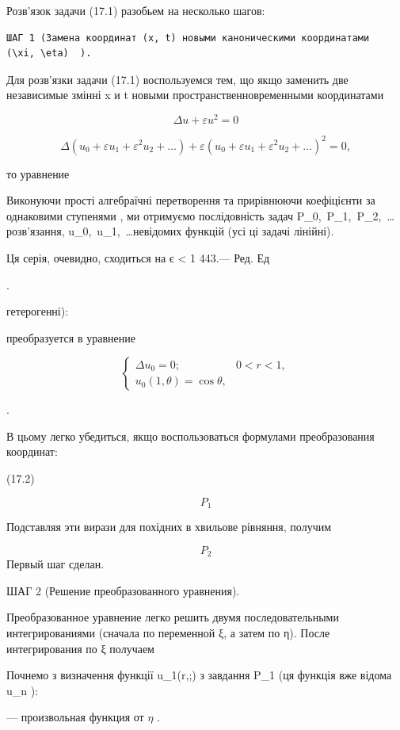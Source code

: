 \documentclass[
  ukrainian,
]{article}
\begin{document}
Розв'язок задачи (17.1) разобьем на несколько шагов:

\begin{verbatim}
ШАГ 1 (Замена координат (x, t) новыми каноническими координатами  (\xi, \eta)  ).
\end{verbatim}

Для розв'язки задачи (17.1) воспользуемся тем, що якщо заменить две
независимые змінні x и t новыми пространственновременными координатами

\[
\Delta u + \varepsilon u^2 = 0
\]

\[
\Delta (u_0 + \varepsilon u_1 + \varepsilon^2 u_2 + \ldots) + \varepsilon (u_0 + \varepsilon u_1 + \varepsilon^2 u_2 + \ldots)^2 = 0,
\]

то уравнение

Виконуючи прості алгебраїчні перетворення та прирівнюючи коефіцієнти за
однаковими ступенями \varepsilon , ми отримуємо послідовність задач
P\_0,~P\_1,~P\_2,~\dots розв'язання, u\_0,~u\_1,~\dots невідомих функцій
(усі ці задачі лінійні).

Ця серія, очевидно, сходиться на \textbar{} є \textbar{} \textless{} 1
443.--- Ред. Ед

.

гетерогенні):

преобразуется в уравнение

\[
\begin{cases} \Delta u_{0} = 0; & 0 < r < 1, \\ u_{0}(1, \theta) = \cos \theta, \end{cases}
\]

.

В цьому легко убедиться, якщо воспользоваться формулами преобразования
координат:

(17.2)

\[
P_{1}
\]

Подставляя эти вирази для похідних в хвильове рівняння, получим

\[
P_{2}
\] Первый шаг сделан.

ШАГ 2 (Решение преобразованного уравнения).

Преобразованное уравнение легко решить двумя последовательными
интегрированиями (сначала по переменной ξ, а затем по η). После
интегрирования по ξ получаем

Почнемо з визначення функції u\_1\left(r,;\theta\right) з завдання P\_1
(ця функція вже відома u\_n ):

--- произвольная функция от \(\eta\) .
\end{document}
